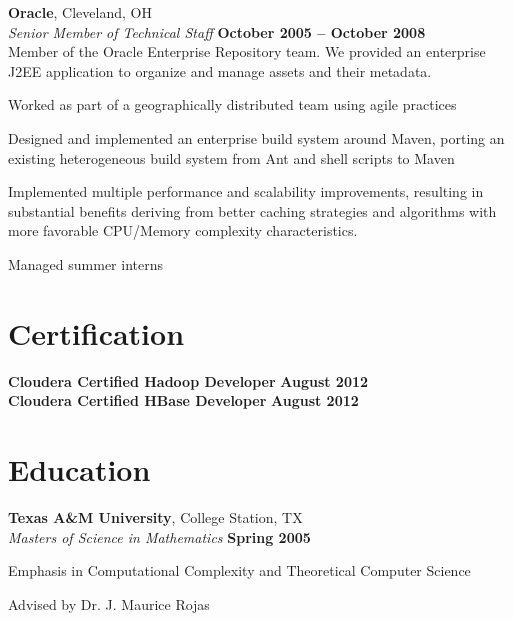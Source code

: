 \documentclass[margin,line,12pt]{resume}
\begin{document}
\begin{resume}
    
    \textbf{Oracle}, Cleveland, OH \vspace{2mm}\\\vspace{1mm}%
    \textsl{Senior Member of Technical Staff} \hfill \textbf{October 2005 -- October 2008}\\
    Member of the Oracle Enterprise Repository team.  We provided an enterprise J2EE application to organize and manage assets and their metadata. 
    \begin{list2}
    \item Worked as part of a geographically distributed team using agile practices
    \item Designed and implemented an enterprise build system around Maven, porting an existing heterogeneous build system from Ant and shell scripts to Maven
    \item Implemented multiple performance and scalability improvements, resulting in substantial benefits deriving from better caching strategies and algorithms with more favorable CPU/Memory complexity characteristics.
    \item Managed summer interns
    \end{list2}
    
    \newpage
    \vspace*{1mm}

    \section{\mysidestyle Certification}
    \textbf{Cloudera Certified Hadoop Developer} \hfill \textbf{August 2012}\\
    \textbf{Cloudera Certified HBase Developer} \hfill \textbf{August 2012}

    \section{\mysidestyle Education}

    \textbf{Texas A\&M University}, College Station, TX \vspace{2mm}\\\vspace{1mm}%
    \textsl{Masters of Science in Mathematics} \hfill \textbf{ Spring 2005}\vspace{-3mm}\\\vspace{-1mm}%
    \begin{list2}
        \item Emphasis in Computational Complexity and Theoretical Computer Science
        \item Advised by Dr. J. Maurice Rojas
    \end{list2}\vspace{-1.5mm}
    

\end{resume}
\end{document}
